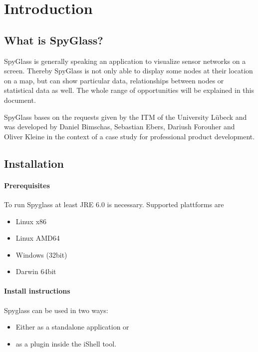 \section{Introduction}
\label{section:s_introduction}

\subsection{What is SpyGlass?}
SpyGlass is generally speaking an application to visualize sensor networks on a screen. Thereby SpyGlass is not only able to display
some nodes at their location on a map, but can show particular data, relationships between nodes or statistical data as well.
The whole range of opportunities will be explained in this document.

SpyGlass bases on the requests given by the ITM of the University Lübeck and was developed by Daniel Bimschas, Sebastian Ebers,
Dariush Forouher and Oliver Kleine in the context of a case study for professional product development.

\subsection{Installation}

\paragraph{Prerequisites}

To run Spyglass at least JRE 6.0 is necessary. Supported plattforms are

\begin{itemize}
  \item{Linux x86}
  \item{Linux AMD64}
  \item{Windows (32bit)}
  \item{Darwin 64bit}
\end{itemize}

\paragraph{Install instructions}

Spyglass can be used in two ways:

\begin{itemize}
  \item{Either as a standalone application or}
  \item{as a plugin inside the iShell tool.}
\end{itemize}


